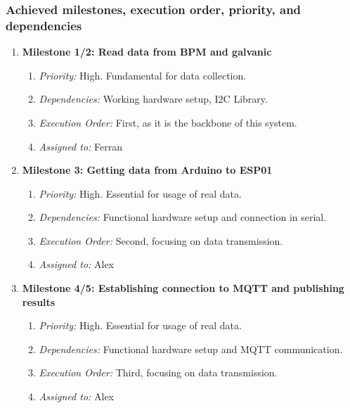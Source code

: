 \subsubsection{Achieved milestones, execution order, priority, and dependencies}
\begin{enumerate}
    \item \textbf{Milestone 1/2: Read data from BPM and galvanic}
        \begin{enumerate}
            \item \textit{Priority:} High. Fundamental for data collection.
            \item \textit{Dependencies:} Working hardware setup, I2C Library.
            \item \textit{Execution Order:} First, as it is the backbone of this system.
            \item \textit{Assigned to:} Ferran
        \end{enumerate}


    \item \textbf{Milestone 3: Getting data from Arduino to ESP01}
        \begin{enumerate}
            \item \textit{Priority:} High. Essential for usage of real data.
            \item \textit{Dependencies:} Functional hardware setup and connection in serial.
            \item \textit{Execution Order:} Second, focusing on data transmission.
            \item \textit{Assigned to:} Alex
        \end{enumerate}

    \item \textbf{Milestone 4/5: Establishing connection to MQTT and publishing results}
        \begin{enumerate}
            \item \textit{Priority:} High. Essential for usage of real data.
            \item \textit{Dependencies:} Functional hardware setup and MQTT communication.
            \item \textit{Execution Order:} Third, focusing on data transmission.
            \item \textit{Assigned to:} Alex
        \end{enumerate}
\end{enumerate}

